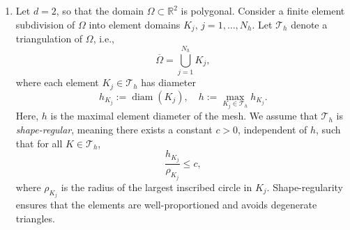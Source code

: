 \documentclass[a4paper, 11pt]{article}
\theoremstyle{remark}
\begin{document}
\begin{enumerate}[label=(\arabic*)]
\textit{Illustrative example:} 
Consider the bounded domain $\Omega = (0,1)$, and a subdivision into $N_h = 10$ finite element domains, each of size $h = 0.1$:
\begin{equation*}
    K_1 = [0,0.1], \quad K_2 = [0.1,0.2], \quad\ldots, \quad K_{10} = [0.9,1].
\end{equation*}
Let the non-overlapping subdomains be defined by grouping elements:
\begin{align*}
    \widetilde{\Omega}_1 &= \operatorname{int}(K_1 \cup K_2 \cup K_3) = (0,0.3),\\
    \widetilde{\Omega}_2 &= \operatorname{int}(K_4 \cup K_5 \cup K_6) = (0.3,0.6),\\
    \widetilde{\Omega}_3 &= \operatorname{int}(K_7 \cup K_8 \cup K_9 \cup K_{10}) = (0.6,1).
\end{align*}
If we choose $\delta = h$, that is, we extend each subdomain by one neighboring element on each side, then the overlapping subdomains become
\begin{align*}
    \Omega_1 &= \operatorname{int}(K_1 \cup K_2 \cup K_3 \cup K_4) = (0,0.4),\\
    \Omega_2 &= \operatorname{int}(K_3 \cup K_4 \cup K_5 \cup K_6 \cup K_7) = (0.2,0.7),\\
    \Omega_3 &= \operatorname{int}(K_6 \cup K_7 \cup K_8 \cup K_9 \cup K_{10}) = (0.5,1).
\end{align*}
Here, each $\Omega_i$ is an open interval consisting of all elements of the corresponding non-overlapping subdomain together with one neighboring element on each side (whenever available). The overlap, therefore, occurs only along full elements, ensuring that the decomposition respects the finite element mesh.
\item Let $d = 2$, so that the domain $\Omega \subset \mathbb{R}^{2}$ is polygonal. Consider a finite element subdivision of $\Omega$ into element domains $K_j$, $j = 1, \ldots, N_h$. Let $\mathcal{T}_h$ denote a triangulation of $\Omega$, i.e.,  
\begin{equation*}
    \overline{\Omega} = \bigcup_{j=1}^{N_h} K_j,
\end{equation*}  
where each element $K_j \in \mathcal{T}_h$ has diameter
\begin{equation*}
    h_{K_j} := \operatorname{diam}(K_j), \quad h := \max_{K_j \in \mathcal{T}_h} h_{K_j}.
\end{equation*}  
Here, $h$ is the maximal element diameter of the mesh. We assume that $\mathcal{T}_h$ is \emph{shape-regular}, meaning there exists a constant $c > 0$, independent of $h$, such that for all $K \in \mathcal{T}_h$,  
\begin{equation*}
    \frac{h_{K_{j}}}{\rho_{K_{j}}} \leq c,
\end{equation*}  
where $\rho_{K_{j}}$ is the radius of the largest inscribed circle in $K_{j}$. Shape-regularity ensures that the elements are well-proportioned and avoids degenerate triangles.  


\end{enumerate}
\end{document}
